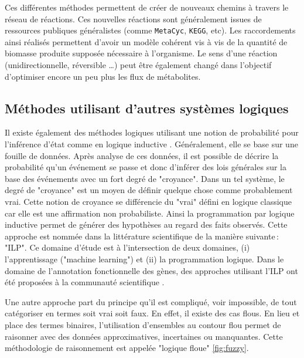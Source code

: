 \begin{refsegment}
    Ces différentes méthodes permettent de créer de nouveaux chemins à travers le réseau de réactions. Ces nouvelles réactions sont généralement issues de ressources publiques généralistes (comme \texttt{MetaCyc}, \texttt{KEGG}, etc). Les raccordements ainsi réalisés permettent d’avoir un modèle cohérent vis à vis de la quantité de biomasse produite supposée nécessaire à l’organisme. Le sens d’une réaction (unidirectionnelle, réversible \ldots) peut être également changé dans l’objectif d’optimiser encore un peu plus les flux de métabolites.
    
    \subsection{Méthodes utilisant d'autres systèmes logiques }
    
    Il existe également des méthodes logiques utilisant une notion de probabilité pour l'inférence d'état comme en logique inductive \cite{michalski1983theory,muggleton1994inductive}. Généralement, elle se base sur une fouille de données. Après analyse de ces données, il est possible de décrire la probabilité qu'un événement se passe et donc d'inférer des lois générales sur la base des événements avec un fort degré de "croyance". Dans un tel système, le degré de "croyance" est un moyen de définir quelque chose comme probablement vrai. Cette notion de croyance se différencie du "vrai" défini en logique classique car elle est une affirmation non probabiliste. Ainsi la programmation par logique inductive permet de générer des hypothèses au regard des faits observés. Cette approche est nommée dans la littérature scientifique de la manière suivante : "\gls{ILP}". Ce domaine d'étude est à l'intersection de deux domaines, (i) l'apprentissage ("machine learning") et (ii) la programmation logique. Dans le domaine de l'annotation fonctionnelle des gènes, des approches utilisant l'\gls{ILP} ont été proposées à la communauté scientifique \cite{clare2003predicting,king2004applying}.
    
    Une autre approche part du principe qu'il est compliqué, voir impossible, de tout catégoriser en termes soit vrai soit faux. En effet, il existe des cas flous. En lieu et place des termes binaires, l'utilisation d'ensembles au contour flou permet de raisonner avec des données approximatives, incertaines ou manquantes. Cette méthodologie de raisonnement est appelée "logique floue" \ref{fig:fuzzy}.
        

\end{refsegment}
